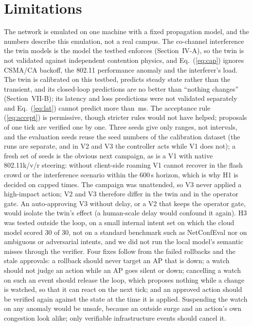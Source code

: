 \documentclass[conference]{IEEEtran}
\begin{document}
\section{Limitations}
The network is emulated on one machine with a fixed propagation model, and the numbers describe this emulation, not a real campus. The co-channel interference the twin models is the model the testbed enforces (Section~IV-A), so the twin is not validated against independent contention physics, and Eq.~(\ref{eq:cap}) ignores CSMA/CA backoff, the 802.11 performance anomaly and the interferer's load. The twin is calibrated on this testbed, predicts steady state rather than the transient, and its closed-loop predictions are no better than ``nothing changes'' (Section~VII-B); its latency and loss predictions were not validated separately and Eq.~(\ref{eq:lat}) cannot predict more than \CfgLatCap\,ms. The acceptance rule (\ref{eq:accept}) is permissive, though stricter rules would not have helped; proposals of one tick are verified one by one. Three seeds give only ranges, not intervals, and the evaluation seeds reuse the seed numbers of the calibration dataset (the runs are separate, and in V2 and V3 the controller acts while V1 does not); a fresh set of seeds is the obvious next campaign, as is a V1 with native 802.11k/v/r steering: without client-side roaming V1 cannot recover in the flash crowd or the interference scenario within the 600\,s horizon, which is why H1 is decided on capped times. The campaign was unattended, so V3 never applied a high-impact action; V2 and V3 therefore differ in the twin and in the operator gate. An auto-approving V3 without delay, or a V2 that keeps the operator gate, would isolate the twin's effect (a human-scale delay would confound it again). H3 was tested outside the loop, on a small internal intent set on which the cloud model scored 30 of 30, not on a standard benchmark such as NetConfEval nor on ambiguous or adversarial intents, and we did not run the local model's semantic misses through the verifier. Four fixes follow from the failed rollbacks and the stale approvals: a rollback should never target an AP that is down; a watch should not judge an action while an AP goes silent or down; cancelling a watch on such an event should release the loop, which proposes nothing while a change is watched, so that it can react on the next tick; and an approved action should be verified again against the state at the time it is applied. Suspending the watch on any anomaly would be unsafe, because an outside surge and an action's own congestion look alike; only verifiable infrastructure events should cancel it.
\end{document}
